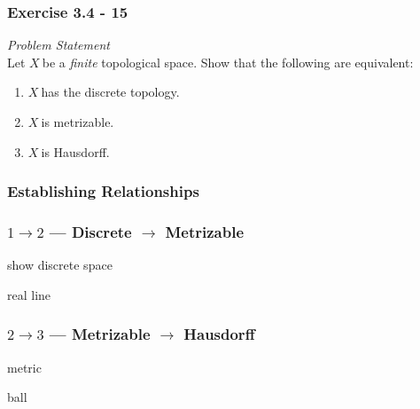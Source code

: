 
\newcommand{\topx}{\ensuremath{X~}}

\begin{frame}
    \frametitle{Exercise 3.4 - 15}
    \textit{Problem Statement}\\
    Let \topx be a \emph{finite} topological space. Show that the following are
    equivalent:
    \begin{enumerate}
        \item \topx has the discrete topology.
        \item \topx is metrizable.
        \item \topx is Hausdorff.
    \end{enumerate}
\end{frame}

\begin{frame}
    \frametitle{Establishing Relationships}
    \centering

\end{frame}

\begin{frame}
    \frametitle{\(1 \rightarrow 2\) --- Discrete \(\rightarrow\) Metrizable}

    show discrete space

    \pause

    real line

\end{frame}

\begin{frame}
    \frametitle{\(2 \rightarrow 3\) --- Metrizable \(\rightarrow\) Hausdorff}

    metric

    ball

\end{frame}

